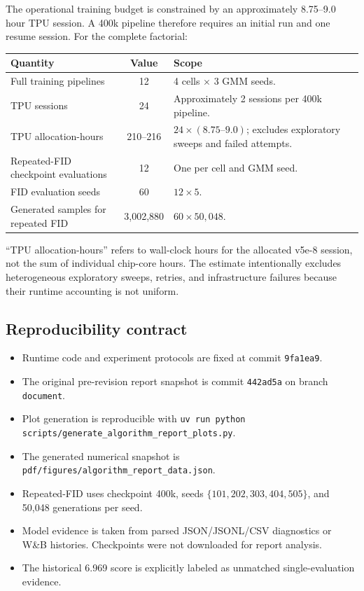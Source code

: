 \documentclass[11pt,a4paper]{article}
\newcommand{\run}[1]{{\small\nolinkurl{#1}}}
\begin{document}
The operational training budget is constrained by an approximately
8.75--9.0 hour TPU session. A 400k pipeline therefore requires an initial run
and one resume session. For the complete factorial:

\begin{center}
\small
\begin{tabularx}{\linewidth}{@{}Y c Y@{}}
\toprule
\textbf{Quantity} & \textbf{Value} & \textbf{Scope}\\
\midrule
Full training pipelines & 12 & 4 cells \(\times\) 3 GMM seeds.\\
TPU sessions & 24 & Approximately 2 sessions per 400k pipeline.\\
TPU allocation-hours & 210--216 & \(24\times(8.75\text{--}9.0)\);
excludes exploratory sweeps and failed attempts.\\
Repeated-FID checkpoint evaluations & 12 & One per cell and GMM seed.\\
FID evaluation seeds & 60 & \(12\times5\).\\
Generated samples for repeated FID & 3,002,880 &
\(60\times50{,}048\).\\
\bottomrule
\end{tabularx}
\end{center}

``TPU allocation-hours'' refers to wall-clock hours for the allocated v5e-8
session, not the sum of individual chip-core hours. The estimate intentionally
excludes heterogeneous exploratory sweeps, retries, and infrastructure
failures because their runtime accounting is not uniform.

\subsection{Reproducibility contract}

\begin{itemize}
  \item Runtime code and experiment protocols are fixed at commit
  \run{9fa1ea9}.
  \item The original pre-revision report snapshot is commit
  \run{442ad5a} on branch \run{document}.
  \item Plot generation is reproducible with
  \run{uv run python scripts/generate_algorithm_report_plots.py}.
  \item The generated numerical snapshot is
  \run{pdf/figures/algorithm_report_data.json}.
  \item Repeated-FID uses checkpoint 400k, seeds
  \(\{101,202,303,404,505\}\), and 50,048 generations per seed.
  \item Model evidence is taken from parsed JSON/JSONL/CSV diagnostics or
  W\&B histories. Checkpoints were not downloaded for report analysis.
  \item The historical 6.969 score is explicitly labeled as unmatched
  single-evaluation evidence.
\end{itemize}
\end{document}
